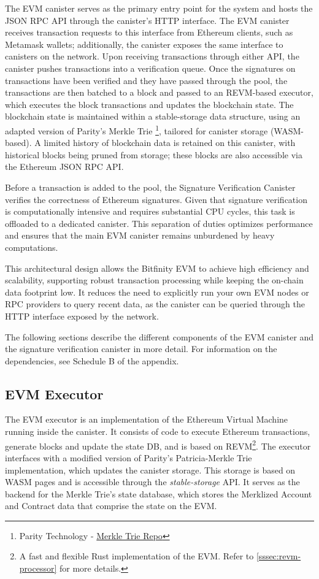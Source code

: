 \documentclass{article}
\begin{document}
 The EVM canister serves as the primary entry point for the system and hosts the JSON RPC API through the canister’s HTTP interface. The EVM canister receives transaction requests to this interface from Ethereum clients, such as Metamask wallets; additionally, the canister exposes the same interface to canisters on the network. Upon receiving transactions through either API, the canister pushes transactions into a verification queue. Once the signatures on transactions have been verified and they have passed through the pool, the transactions are then batched to a  block and passed to an REVM-based executor, which executes the block transactions and updates the blockchain state. The blockchain state is maintained within a stable-storage data structure, using an adapted version of Parity’s Merkle Trie \footnote{Parity Technology - \href{https://github.com/paritytech/trie}{Merkle Trie Repo}}, tailored for canister storage (WASM-based). A limited history of blockchain data is retained on this canister, with historical blocks being pruned from storage; these blocks are also accessible via the Ethereum JSON RPC API.

Before a transaction is added to the pool, the Signature Verification Canister verifies the correctness of Ethereum signatures. Given that signature verification is computationally intensive and requires substantial CPU cycles, this task is offloaded to a dedicated canister. This separation of duties optimizes performance and ensures that the main EVM canister remains unburdened by heavy computations.

This architectural design allows the Bitfinity EVM to achieve high efficiency and scalability, supporting robust transaction processing while keeping the on-chain data footprint low. It reduces the need to explicitly run your own EVM nodes or RPC providers to query recent data, as the canister can be queried through the HTTP interface exposed by the network. 

The following sections describe the different components of the EVM canister and the signature verification canister in more detail. For information on the dependencies, see Schedule B of the appendix.  

\subsection{EVM Executor}
The EVM executor is an implementation of the Ethereum Virtual Machine running inside the canister. It consists of code to execute Ethereum transactions, generate blocks and update the state DB, and is based on REVM\footnote{A fast and flexible Rust implementation of the EVM. Refer to \ref{sssec:revm-processor} for more details.}. The executor interfaces with a modified version of Parity's Patricia-Merkle Trie implementation, which updates the canister storage. This storage is based on WASM pages and is accessible through the \textit{stable-storage} API. It serves as the backend for the Merkle Trie's state database, which stores the Merklized Account and Contract data that comprise the state on the EVM.
\end{document}
